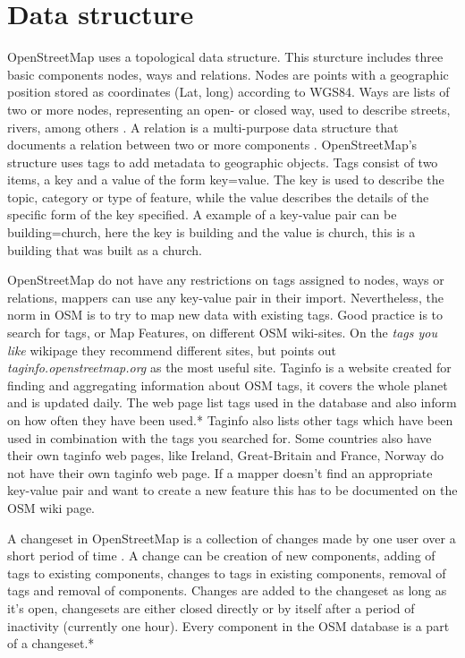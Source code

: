 \section{Data structure}
OpenStreetMap uses a topological data structure. This sturcture includes three basic components nodes, ways and relations. Nodes are points with a geographic position stored as coordinates (Lat, long) according to WGS84. Ways are lists of two or more nodes, representing an open- or closed way, used to describe streets, rivers, among others \cite{Debruyne2015}. A relation is a multi-purpose data structure that documents a relation between two or more components \cite{OpenStreetMapg}. OpenStreetMap's structure uses tags to add metadata to geographic objects. Tags consist of two items, a key and a value of the form key=value. The key is used to describe the topic, category or type of feature, while the value describes the details of the specific form of the key specified. A example of a key-value pair can be building=church, here the key is building and the value is church, this is a building that was built as a church. 

OpenStreetMap do not have any restrictions on tags assigned to nodes, ways or relations, mappers can use any key-value pair in their import. Nevertheless, the norm in OSM is to try to map new data with existing tags. Good practice is to search for tags, or Map Features, on different OSM wiki-sites. On the \textit{tags you like} wikipage they recommend different sites, but points out \textit{taginfo.openstreetmap.org} as the most useful site. Taginfo is a website created for finding and aggregating information about OSM tags, it covers the whole planet and is updated daily. The web page list tags used in the database and also inform on how often they have been used.* %
 Taginfo also lists other tags which have been used in combination with the tags you searched for. Some countries also have their own taginfo web pages, like Ireland, Great-Britain and France, Norway do not have their own taginfo web page. If a mapper doesn't find an appropriate key-value pair and want to create a new feature this has to be documented on the OSM wiki page. 
 

A changeset in OpenStreetMap is a collection of changes made by one user over a short period of time \cite{OpenStreetMapi}.  A change can be creation of new components, adding of tags to existing components, changes to tags in existing components, removal of tags and removal of components. Changes are added to the changeset as long as it's open, changesets are either closed directly or by itself after a period of inactivity (currently one hour). Every component in the OSM database is a part of a changeset.* %


